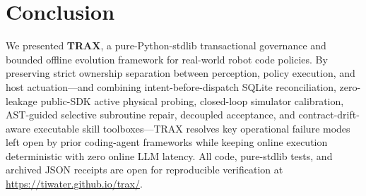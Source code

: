 \documentclass{trax}
\begin{document}
\section{Conclusion}
\label{sec:conclusion}

We presented \textbf{TRAX}, a pure-Python-stdlib transactional governance and bounded offline evolution framework for real-world robot code policies. By preserving strict ownership separation between perception, policy execution, and host actuation---and combining intent-before-dispatch SQLite reconciliation, zero-leakage public-SDK active physical probing, closed-loop simulator calibration, AST-guided selective subroutine repair, decoupled acceptance, and contract-drift-aware executable skill toolboxes---TRAX resolves key operational failure modes left open by prior coding-agent frameworks while keeping online execution deterministic with zero online LLM latency. All code, pure-stdlib tests, and archived JSON receipts are open for reproducible verification at \url{https://tiwater.github.io/trax/}.



\end{document}
